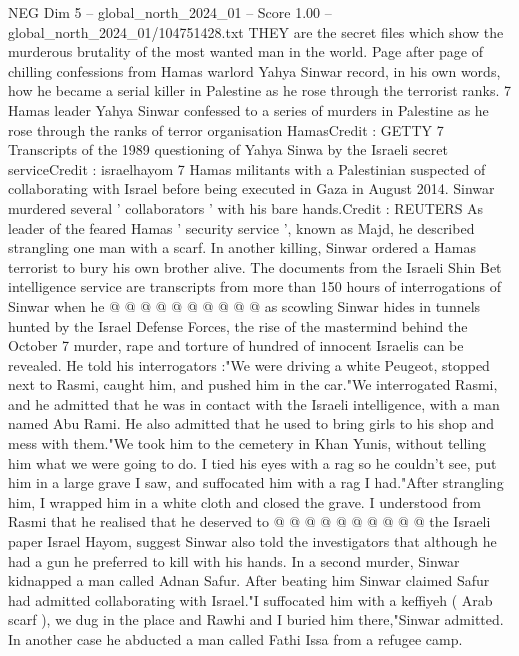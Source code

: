 \begin{textsample}{NEG Dim 5 – global\_north\_2024\_01 – Score 1.00 – global\_north\_2024\_01/104751428.txt}  \label{ex:f5_neg_317}
THEY are the secret files which show the murderous brutality of the most wanted man in the world.
Page after page of chilling confessions from Hamas warlord Yahya Sinwar record, in his own words, how he became a serial killer in Palestine as he rose through the terrorist ranks. 7 Hamas leader Yahya Sinwar confessed to a series of murders in Palestine as he rose through the ranks of terror organisation HamasCredit : GETTY 7 Transcripts of the 1989 questioning of Yahya Sinwa by the Israeli secret serviceCredit : israelhayom 7 Hamas militants with a Palestinian suspected of collaborating with Israel before being executed in Gaza in August 2014.
Sinwar murdered several ' collaborators ' with his bare hands.Credit : REUTERS As leader of the feared Hamas ' security service ', known as Majd, he described strangling one man with a scarf.
In another killing, Sinwar ordered a Hamas terrorist to bury his own brother alive.
The documents from the Israeli Shin Bet intelligence service are transcripts from more than 150 hours of interrogations of Sinwar when he @ @ @ @ @ @ @ @ @ @ as scowling Sinwar hides in tunnels hunted by the Israel Defense Forces, the rise of the mastermind behind the October 7 murder, rape and torture of hundred of innocent Israelis can be revealed.
He told his interrogators :"We were driving a white Peugeot, stopped next to Rasmi, caught him, and pushed him in the car."We interrogated Rasmi, and he admitted that he was in contact with the Israeli intelligence, with a man named Abu Rami.
He also admitted that he used to bring girls to his shop and mess with them."We took him to the cemetery in Khan Yunis, without telling him what we were going to do.
I tied his eyes with a rag so he couldn't see, put him in a large grave I saw, and suffocated him with a rag I had."After strangling him, I wrapped him in a white cloth and closed the grave.
I understood from Rasmi that he realised that he deserved to @ @ @ @ @ @ @ @ @ @ the Israeli paper Israel Hayom, suggest Sinwar also told the investigators that although he had a gun he preferred to kill with his hands.
In a second murder, Sinwar kidnapped a man called Adnan Safur.
After beating him Sinwar claimed Safur had admitted collaborating with Israel."I suffocated him with a keffiyeh ( Arab scarf ), we dug in the place and Rawhi and I buried him there,"Sinwar admitted.
In another case he abducted a man called Fathi Issa from a refugee camp.

\end{textsample}
